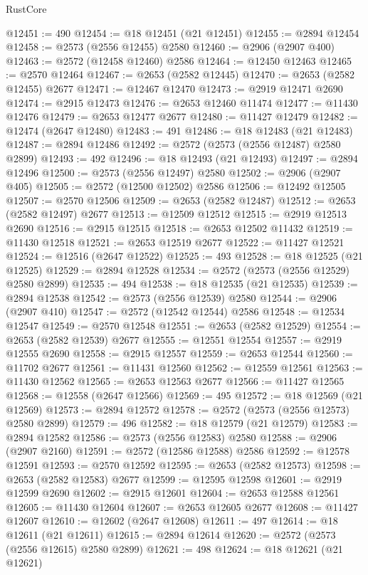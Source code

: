 \begin{lexlean}{RustCore}
\begin{coremodule}
@12451 := 490
@12454 := @18 @12451 (@21 @12451)
@12455 := @2894 @12454
@12458 := @2573 (@2556 @12455) @2580
@12460 := @2906 (@2907 @400)
@12463 := @2572 (@12458 @12460) @2586
@12464 := @12450 @12463
@12465 := @2570 @12464
@12467 := @2653 (@2582 @12445)
@12470 := @2653 (@2582 @12455) @2677
@12471 := @12467 @12470
@12473 := @2919 @12471 @2690
@12474 := @2915 @12473
@12476 := @2653 @12460 @11474
@12477 := @11430 @12476
@12479 := @2653 @12477 @2677
@12480 := @11427 @12479
@12482 := @12474 (@2647 @12480)
@12483 := 491
@12486 := @18 @12483 (@21 @12483)
@12487 := @2894 @12486
@12492 := @2572 (@2573 (@2556 @12487) @2580 @2899)
@12493 := 492
@12496 := @18 @12493 (@21 @12493)
@12497 := @2894 @12496
@12500 := @2573 (@2556 @12497) @2580
@12502 := @2906 (@2907 @405)
@12505 := @2572 (@12500 @12502) @2586
@12506 := @12492 @12505
@12507 := @2570 @12506
@12509 := @2653 (@2582 @12487)
@12512 := @2653 (@2582 @12497) @2677
@12513 := @12509 @12512
@12515 := @2919 @12513 @2690
@12516 := @2915 @12515
@12518 := @2653 @12502 @11432
@12519 := @11430 @12518
@12521 := @2653 @12519 @2677
@12522 := @11427 @12521
@12524 := @12516 (@2647 @12522)
@12525 := 493
@12528 := @18 @12525 (@21 @12525)
@12529 := @2894 @12528
@12534 := @2572 (@2573 (@2556 @12529) @2580 @2899)
@12535 := 494
@12538 := @18 @12535 (@21 @12535)
@12539 := @2894 @12538
@12542 := @2573 (@2556 @12539) @2580
@12544 := @2906 (@2907 @410)
@12547 := @2572 (@12542 @12544) @2586
@12548 := @12534 @12547
@12549 := @2570 @12548
@12551 := @2653 (@2582 @12529)
@12554 := @2653 (@2582 @12539) @2677
@12555 := @12551 @12554
@12557 := @2919 @12555 @2690
@12558 := @2915 @12557
@12559 := @2653 @12544
@12560 := @11702 @2677
@12561 := @11431 @12560
@12562 := @12559 @12561
@12563 := @11430 @12562
@12565 := @2653 @12563 @2677
@12566 := @11427 @12565
@12568 := @12558 (@2647 @12566)
@12569 := 495
@12572 := @18 @12569 (@21 @12569)
@12573 := @2894 @12572
@12578 := @2572 (@2573 (@2556 @12573) @2580 @2899)
@12579 := 496
@12582 := @18 @12579 (@21 @12579)
@12583 := @2894 @12582
@12586 := @2573 (@2556 @12583) @2580
@12588 := @2906 (@2907 @2160)
@12591 := @2572 (@12586 @12588) @2586
@12592 := @12578 @12591
@12593 := @2570 @12592
@12595 := @2653 (@2582 @12573)
@12598 := @2653 (@2582 @12583) @2677
@12599 := @12595 @12598
@12601 := @2919 @12599 @2690
@12602 := @2915 @12601
@12604 := @2653 @12588 @12561
@12605 := @11430 @12604
@12607 := @2653 @12605 @2677
@12608 := @11427 @12607
@12610 := @12602 (@2647 @12608)
@12611 := 497
@12614 := @18 @12611 (@21 @12611)
@12615 := @2894 @12614
@12620 := @2572 (@2573 (@2556 @12615) @2580 @2899)
@12621 := 498
@12624 := @18 @12621 (@21 @12621)

\end{coremodule}
\end{lexlean}
